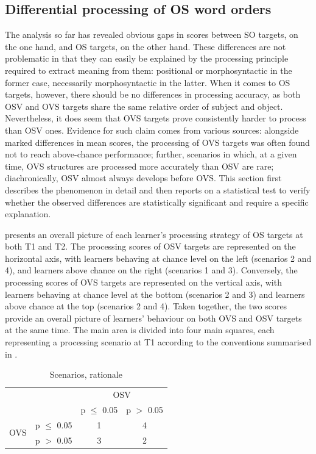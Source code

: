 \subsection{Differential processing of OS word orders}\label{sec:05:2.5}

The analysis so far has revealed obvious gaps in scores between SO targets, on the one hand, and OS targets, on the other hand. These differences are not problematic in that they can easily be explained by the processing principle required to extract meaning from them: positional or morphosyntactic in the former case, necessarily morphosyntactic in the latter. When it comes to OS targets, however, there should be no differences in processing accuracy, as both OSV and OVS targets share the same relative order of subject and object. Nevertheless, it does seem that OVS targets prove consistently harder to process than OSV ones. Evidence for such claim comes from various sources: alongside marked differences in mean scores, the processing of OVS targets was often found not to reach above-chance performance; further, scenarios in which, at a given time, OVS structures are processed more accurately than OSV are rare; diachronically, OSV almost always develops before OVS. This section first describes the phenomenon in detail and then reports on a statistical test to verify whether the observed differences are statistically significant and require a specific explanation.

 presents an overall picture of each learner's processing strategy of OS targets at both T1 and T2. The processing scores of OSV targets are represented on the horizontal axis, with learners behaving at chance level on the left (scenarios 2 and 4), and learners above chance on the right (scenarios 1 and 3). Conversely, the processing scores of OVS targets are represented on the vertical axis, with learners behaving at chance level at the bottom (scenarios 2 and 3) and learners above chance at the top (scenarios 2 and 4). Taken together, the two scores provide an overall picture of learners' behaviour on both OVS and OSV targets at the same time. The main area is divided into four main squares, each representing a processing scenario at T1 according to the conventions summarised in .

\begin{table}
    \begin{tabular}{|lc|cc|}
    \hline
    & & \multicolumn{2}{c|}{OSV}\\
    &  & p ${\leq}$ 0.05 & p $>$ 0.05\\
    \hline
    \multirow{2}{*}{OVS} & p ${\leq}$ 0.05 & 1 & 4\\
                         & p $>$ 0.05 & 3 & 2\\
    \hline
    \end{tabular}
    \caption{Scenarios, rationale}
    \label{tab:05:6}
\end{table}

